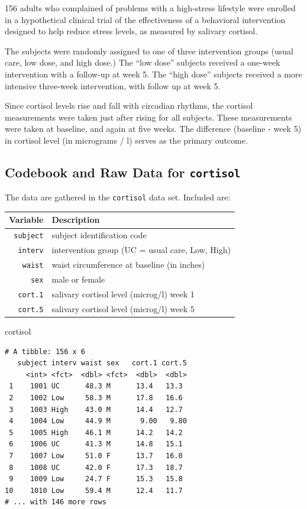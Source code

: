 \documentclass[]{book}
\newenvironment{Shaded}{\begin{snugshade}}{\end{snugshade}}
\newcommand{\NormalTok}[1]{#1}
\theoremstyle{definition}
\theoremstyle{definition}
\theoremstyle{definition}
\theoremstyle{remark}
\begin{document}
156 adults who complained of problems with a high-stress lifestyle were
enrolled in a hypothetical clinical trial of the effectiveness of a
behavioral intervention designed to help reduce stress levels, as
measured by salivary cortisol.

The subjects were randomly assigned to one of three intervention groups
(usual care, low dose, and high dose.) The ``low dose'' subjects
received a one-week intervention with a follow-up at week 5. The ``high
dose'' subjects received a more intensive three-week intervention, with
follow up at week 5.

Since cortisol levels rise and fall with circadian rhythms, the cortisol
measurements were taken just after rising for all subjects. These
measurements were taken at baseline, and again at five weeks. The
difference (baseline - week 5) in cortisol level (in micrograms / l)
serves as the primary outcome.

\subsection{\texorpdfstring{Codebook and Raw Data for
\texttt{cortisol}}{Codebook and Raw Data for cortisol}}\label{codebook-and-raw-data-for-cortisol}

The data are gathered in the \texttt{cortisol} data set. Included are:

\begin{longtable}[]{@{}rl@{}}
\toprule
Variable & Description\tabularnewline
\midrule
\endhead
\texttt{subject} & subject identification code\tabularnewline
\texttt{interv} & intervention group (UC = usual care, Low,
High)\tabularnewline
\texttt{waist} & waist circumference at baseline (in
inches)\tabularnewline
\texttt{sex} & male or female\tabularnewline
\texttt{cort.1} & salivary cortisol level (microg/l) week
1\tabularnewline
\texttt{cort.5} & salivary cortisol level (microg/l) week
5\tabularnewline
\bottomrule
\end{longtable}

\begin{Shaded}
\begin{Highlighting}[]
\NormalTok{cortisol}
\end{Highlighting}
\end{Shaded}

\begin{verbatim}
# A tibble: 156 x 6
   subject interv waist sex   cort.1 cort.5
     <int> <fct>  <dbl> <fct>  <dbl>  <dbl>
 1    1001 UC      48.3 M      13.4   13.3 
 2    1002 Low     58.3 M      17.8   16.6 
 3    1003 High    43.0 M      14.4   12.7 
 4    1004 Low     44.9 M       9.00   9.80
 5    1005 High    46.1 M      14.2   14.2 
 6    1006 UC      41.3 M      14.8   15.1 
 7    1007 Low     51.0 F      13.7   16.0 
 8    1008 UC      42.0 F      17.3   18.7 
 9    1009 Low     24.7 F      15.3   15.8 
10    1010 Low     59.4 M      12.4   11.7 
# ... with 146 more rows
\end{verbatim}
\end{document}
